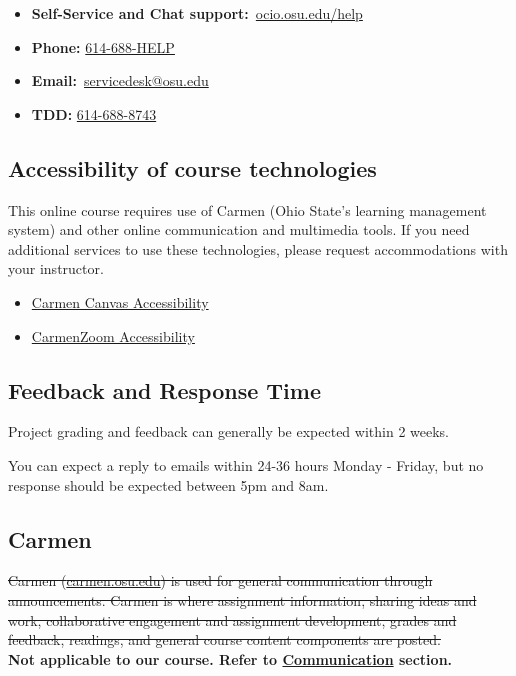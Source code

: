 \begin{itemize}
      \tightlist
      \item
            \textbf{Self-Service and Chat support:}~\href{http://ocio.osu.edu/help}{ocio.osu.edu/help}
      \item
            \textbf{Phone:} \href{tel:6146884357}{614-688-HELP}
      \item
            \textbf{Email:}~\href{mailto:8help@osu.edu}{servicedesk@osu.edu}
      \item
            \textbf{TDD:} \href{tel:6146888743}{614-688-8743}
\end{itemize}

\subsection{Accessibility of course technologies}

This online course requires use of Carmen (Ohio State's learning management system) and other online communication and multimedia tools. If you need additional services to use these technologies, please request accommodations with your instructor.~

\begin{itemize}
      \tightlist
      \item \href{https://community.canvaslms.com/docs/DOC-2061}{Carmen Canvas Accessibility}
      \item \href{https://go.osu.edu/Bqd4}{CarmenZoom Accessibility}
\end{itemize}

\subsection{Feedback and Response Time}

Project grading and feedback can generally be expected within 2 weeks.

You can expect a reply to emails within 24-36 hours Monday - Friday, but no response should be expected between 5pm and 8am.

\subsection{Carmen}

\sout{Carmen (\href{http://carmen.osu.edu/}{carmen.osu.edu}) is used for general communication through announcements. Carmen is where assignment information, sharing ideas and work, collaborative engagement and assignment development, grades and feedback, readings, and general course content components are posted.}\\
\textbf{Not applicable to our course. Refer to \hyperlink{communication}{Communication} section.}

